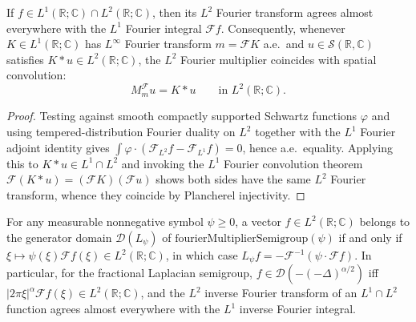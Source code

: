 \begin{theorem}\label{thm:fourier_multiplier_eq_conv}
\leanok
If $f \in L^1(\mathbb{R}; \mathbb{C}) \cap L^2(\mathbb{R}; \mathbb{C})$, then its $L^2$ Fourier transform agrees almost everywhere with the $L^1$ Fourier integral $\mathcal{F} f$. Consequently, whenever $K \in L^1(\mathbb{R}; \mathbb{C})$ has $L^\infty$ Fourier transform $m = \mathcal{F} K$ a.e.\ and $u \in \mathcal{S}(\mathbb{R}, \mathbb{C})$ satisfies $K * u \in L^2(\mathbb{R}; \mathbb{C})$, the $L^2$ Fourier multiplier coincides with spatial convolution:
\[
  M_m^{\mathcal{F}} u = K * u \qquad \text{in } L^2(\mathbb{R}; \mathbb{C}).
\]
\end{theorem}

\begin{proof}
\leanok
Testing against smooth compactly supported Schwartz functions $\varphi$ and using tempered-distribution Fourier duality on $L^2$ together with the $L^1$ Fourier adjoint identity gives $\int \varphi \cdot (\mathcal{F}_{L^2} f - \mathcal{F}_{L^1} f) = 0$, hence a.e.\ equality. Applying this to $K * u \in L^1 \cap L^2$ and invoking the $L^1$ Fourier convolution theorem $\mathcal{F}(K * u) = (\mathcal{F} K)(\mathcal{F} u)$ shows both sides have the same $L^2$ Fourier transform, whence they coincide by Plancherel injectivity.
\end{proof}

\begin{theorem}\label{thm:fourier_multiplier_generator}
\leanok
For any measurable nonnegative symbol $\psi \ge 0$, a vector $f \in L^2(\mathbb{R}; \mathbb{C})$ belongs to the generator domain $\mathcal{D}(L_\psi)$ of $\mathrm{fourierMultiplierSemigroup}(\psi)$ if and only if $\xi \mapsto \psi(\xi)\mathcal{F}f(\xi) \in L^2(\mathbb{R}; \mathbb{C})$, in which case $L_\psi f = -\mathcal{F}^{-1}(\psi \cdot \mathcal{F}f)$. In particular, for the fractional Laplacian semigroup, $f \in \mathcal{D}(-(-\Delta)^{\alpha/2})$ iff $\lvert 2\pi\xi \rvert^\alpha \mathcal{F}f(\xi) \in L^2(\mathbb{R}; \mathbb{C})$, and the $L^2$ inverse Fourier transform of an $L^1 \cap L^2$ function agrees almost everywhere with the $L^1$ inverse Fourier integral.
\end{theorem}

